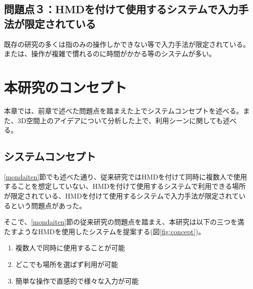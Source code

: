 \documentclass[11pt,a4j, titlepage]{jarticle} %
\begin{document}
\subsection*{問題点３：HMDを付けて使用するシステムで入力手法が限定されている}
既存の研究の多くは指のみの操作しかできない等で入力手法が限定されている。または、操作が複雑で慣れるのに時間がかかる等のシステムが多い。

\newpage
\section{本研究のコンセプト}
本章では、前章で述べた問題点を踏まえた上でシステムコンセプトを述べる。また、3D空間上のアイデアについて分析した上で、利用シーンに関しても述べる。

\subsection{システムコンセプト} \label{concept}
\ref{mondaiten}節でも述べた通り、従来研究ではHMDを付けて同時に複数人で使用することを想定していない、HMDを付けて使用するシステムで利用できる場所が限定されている、HMDを付けて使用するシステムで入力手法が限定されているという問題点があった。

%
%
%

そこで、\ref{mondaiten}節の従来研究の問題点を踏まえ、本研究は以下の三つを満たすようなHMDを使用したシステムを提案する(図\ref{fig:concept})。

\begin{enumerate}
 \item 複数人で同時に使用することが可能
 \item どこでも場所を選ばず利用が可能
 \item 簡単な操作で直感的で様々な入力が可能
\end{enumerate}
\end{document}
